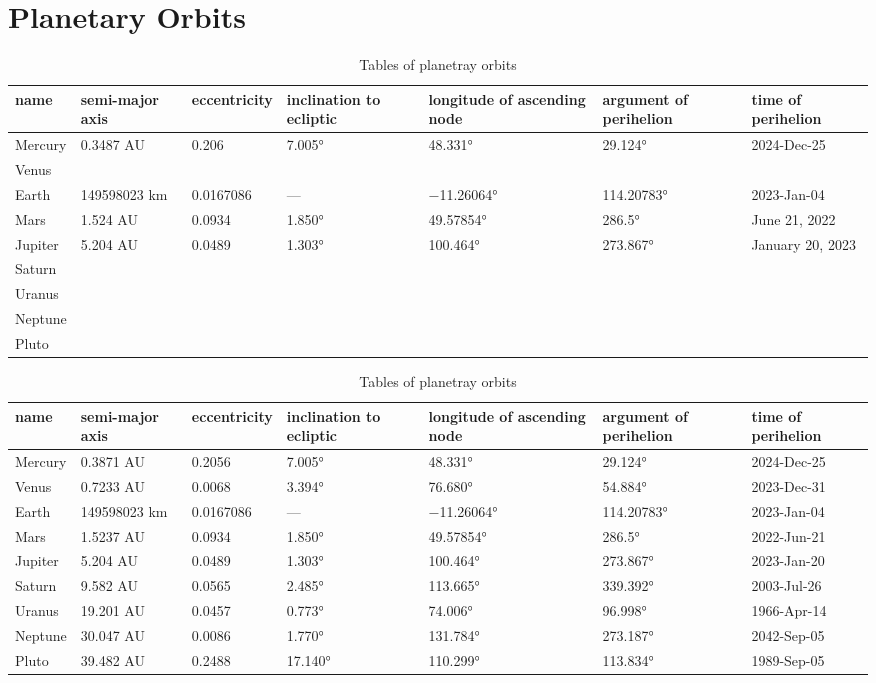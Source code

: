 
\section{Planetary Orbits}
 \begin{table}[h]
 \begin{tabular}{|l| l| l| l| l| l| l|}
 \hline
name & 
\multicolumn{1}{|p{1.5cm}|}{semi-major axis} & 
      eccentricity &
     \multicolumn{1}{|p{1.5cm}|}{inclination to ecliptic} &
     \multicolumn{1}{|p{1.5cm}|}{longitude of \mbox{ascending} node} &
     \multicolumn{1}{|p{2.0cm}|}{argument of perihelion} &
     \multicolumn{1}{|p{2.cm}|}{time of \mbox{perihelion}}\\
\hline
Mercury & 0.3487 AU & 0.206 & 7.005°  & 48.331° & 29.124° & 2024-Dec-25\\
Venus&&&&&&\\
Earth&149598023 km & 0.0167086& ---   &−11.26064°&114.20783°&2023-Jan-04\\
Mars    & 1.524 AU & 0.0934 & 1.850° &49.57854° & 286.5°   &June 21, 2022\\
Jupiter & 5.204 AU & 0.0489 & 1.303° & 100.464° & 273.867° & January 20, 2023\\
Saturn&&&&&&\\
Uranus&&&&&&\\
Neptune&&&&&&\\
Pluto&&&&&&\\
\hline
\end{tabular}
\begin{tabular}{|l| l| l| l| l| l| l|}
\hline
name & 
\multicolumn{1}{|p{1.5cm}|}{semi-major axis} & 
eccentricity &
\multicolumn{1}{|p{1.5cm}|}{inclination to ecliptic} &
\multicolumn{1}{|p{1.5cm}|}{longitude of \mbox{ascending} node} &
\multicolumn{1}{|p{2.0cm}|}{argument of perihelion} &
\multicolumn{1}{|p{2.cm}|}{time of \mbox{perihelion}}\\
\hline
Mercury & 0.3871 AU & 0.2056 & 7.005°  & 48.331° & 29.124° & 2024-Dec-25\\
Venus   & 0.7233 AU & 0.0068 & 3.394°  & 76.680° & 54.884° & 2023-Dec-31\\
Earth   & 149598023 km & 0.0167086& ---   &−11.26064°&114.20783°&2023-Jan-04\\
Mars    & 1.5237 AU & 0.0934 & 1.850° &49.57854° & 286.5°   &2022-Jun-21\\
Jupiter & 5.204 AU & 0.0489 & 1.303° & 100.464° & 273.867° & 2023-Jan-20\\
Saturn  & 9.582 AU & 0.0565 & 2.485° & 113.665° & 339.392° & 2003-Jul-26\\
Uranus  & 19.201 AU & 0.0457 & 0.773° & 74.006° & 96.998° & 1966-Apr-14\\
Neptune & 30.047 AU & 0.0086 & 1.770° & 131.784° & 273.187° & 2042-Sep-05\\
Pluto   & 39.482 AU & 0.2488 & 17.140° & 110.299° & 113.834° & 1989-Sep-05\\
\hline
\end{tabular}

\caption{Tables of planetray orbits}
\end{table}




